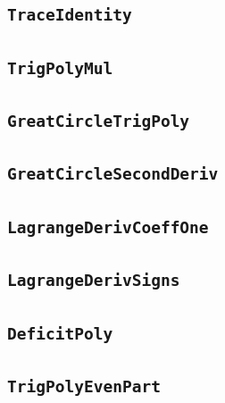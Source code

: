 \documentclass[11pt]{amsart}
\theoremstyle{definition}
\begin{document}
\subsection{\texorpdfstring{\texttt{TraceIdentity}}{TraceIdentity}}\label{node:TraceIdentity}


\subsection{\texorpdfstring{\texttt{TrigPolyMul}}{TrigPolyMul}}\label{node:TrigPolyMul}


\subsection{\texorpdfstring{\texttt{GreatCircleTrigPoly}}{GreatCircleTrigPoly}}\label{node:GreatCircleTrigPoly}


\subsection{\texorpdfstring{\texttt{GreatCircleSecondDeriv}}{GreatCircleSecondDeriv}}\label{node:GreatCircleSecondDeriv}


\subsection{\texorpdfstring{\texttt{LagrangeDerivCoeffOne}}{LagrangeDerivCoeffOne}}\label{node:LagrangeDerivCoeffOne}


\subsection{\texorpdfstring{\texttt{LagrangeDerivSigns}}{LagrangeDerivSigns}}\label{node:LagrangeDerivSigns}


\subsection{\texorpdfstring{\texttt{DeficitPoly}}{DeficitPoly}}\label{node:DeficitPoly}


\subsection{\texorpdfstring{\texttt{TrigPolyEvenPart}}{TrigPolyEvenPart}}\label{node:TrigPolyEvenPart}

\end{document}

